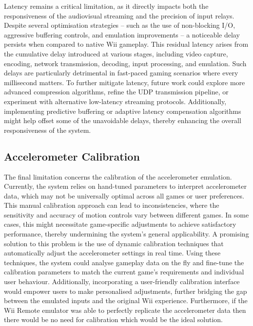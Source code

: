 Latency remains a critical limitation, as it directly impacts both the
responsiveness of the audiovisual streaming and the precision of input relays.
Despite several optimisation strategies -- such as the use of non-blocking I/O,
aggressive buffering controls, and emulation improvements -- a noticeable delay
persists when compared to native Wii gameplay. This residual latency arises from
the cumulative delay introduced at various stages, including video capture,
encoding, network transmission, decoding, input processing, and emulation. Such
delays are particularly detrimental in fast-paced gaming scenarios where every
millisecond matters. To further mitigate latency, future work could explore more
advanced compression algorithms, refine the UDP transmission pipeline, or
experiment with alternative low-latency streaming protocols. Additionally,
implementing predictive buffering or adaptive latency compensation algorithms
might help offset some of the unavoidable delays, thereby enhancing the overall
responsiveness of the system.

\subsection{Accelerometer Calibration}

The final limitation concerns the calibration of the accelerometer emulation.
Currently, the system relies on hand-tuned parameters to interpret accelerometer
data, which may not be universally optimal across all games or user preferences.
This manual calibration approach can lead to inconsistencies, where the
sensitivity and accuracy of motion controls vary between different games. In
some cases, this might necessitate game-specific adjustments to achieve
satisfactory performance, thereby undermining the system’s general
applicability. A promising solution to this problem is the use of dynamic
calibration techniques that automatically adjust the accelerometer settings in
real time. Using these techniques, the system could analyse gameplay data on the
fly and fine-tune the calibration parameters to match the current game’s
requirements and individual user behaviour. Additionally, incorporating a
user-friendly calibration interface would empower users to make personalised
adjustments, further bridging the gap between the emulated inputs and the
original Wii experience. Furthermore, if the Wii Remote emulator was able to
perfectly replicate the accelerometer data then there would be no need for
calibration which would be the ideal solution.

